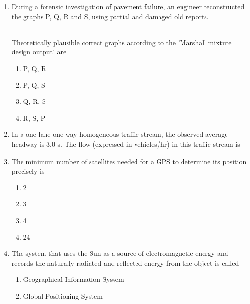 \documentclass[journal]{IEEEtran}
\begin{document}
\begin{enumerate}
\begin{enumerate}
\end{enumerate}
\item During a forensic investigation of pavement failure, an engineer reconstructed the graphs P, Q, R and S, using partial and damaged old reports.
\begin{figure}[!ht]
\centering
\resizebox{0.25\textwidth}{!}{%

}%
\end{figure}
\begin{figure}[!ht]
\centering
\resizebox{0.25\textwidth}{!}{%

}%
\end{figure}
\begin{figure}[!ht]
\centering
\resizebox{0.25\textwidth}{!}{%

}%
\end{figure}
\begin{figure}[!ht]
\centering
\resizebox{0.25\textwidth}{!}{%

}%
\end{figure}
\\
Theoretically plausible correct graphs according to the 'Marshall mixture design output' are
\begin{enumerate}
    \item P, Q, R 
    \item P, Q, S 
    \item Q, R, S 
    \item R, S, P \\
\end{enumerate}
\item In a one-lane one-way homogeneous traffic stream, the observed average headway is 3.0 s. The flow (expressed in vehicles/hr) in this traffic stream is
 $\_\_\_\_$ \\
\item The minimum number of satellites needed for a GPS to determine its position precisely is 
\begin{enumerate}
    \item 2
    \item 3
    \item 4
    \item 24 \\
\end{enumerate}
\item The system that uses the Sun as a source of electromagnetic energy and records the naturally radiated and reflected energy from the object is called
\begin{enumerate}
    \item Geographical Information System
    \item Global Positioning System

\end{enumerate}
\end{enumerate}
\end{document}
